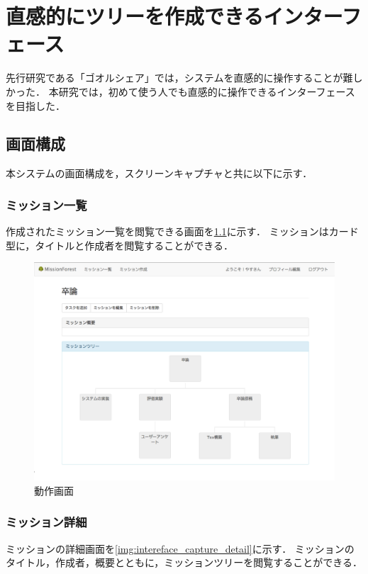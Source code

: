 \chapter{直感的にツリーを作成できるインターフェース}
先行研究である「ゴオルシェア」では，システムを直感的に操作することが難しかった．
本研究では，初めて使う人でも直感的に操作できるインターフェースを目指した．

\section{画面構成}
本システムの画面構成を，スクリーンキャプチャと共に以下に示す．

\subsection{ミッション一覧}
作成されたミッション一覧を閲覧できる画面を\ref{img:intereface_capture_list}に示す．
ミッションはカード型に，タイトルと作成者を閲覧することができる．

\begin{figure}[t]
	\begin{center}
		\includegraphics[width=0.9\linewidth]{assets/img/interface_capture.png}
		\caption{動作画面}
		\label{img:intereface_capture_list}
	\end{center}
\end{figure}

\subsection{ミッション詳細}
ミッションの詳細画面を\ref{img:intereface_capture_detail}に示す．
ミッションのタイトル，作成者，概要とともに，ミッションツリーを閲覧することができる．

